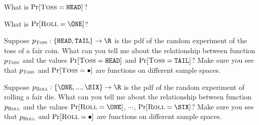   \begin{myenum}

  \item What is
    $\Pr[\textsc{Toss} = \texttt{HEAD}]$?
    
  \item
    What is
    $\Pr[\textsc{Roll} = \ONE]$?
    
  \item
    Suppose $p_{\textsc{Toss}}: \{\HEAD, \TAIL\} \rightarrow \R$
    is the pdf of the random experiment of the toss of a fair coin.
    What can you tell me about the relationship between
    function $p_{\textsc{Toss}}$ and the values
    $\Pr[\textsc{Toss} = \texttt{HEAD}]$ and
    $\Pr[\textsc{Toss} = \texttt{TAIL}]$?
    Make sure you see that $p_{\textsc{Toss}}$ and
    $\Pr[\textsc{Toss} = \bullet]$ are functions on different
    sample spaces.
    
  \item
    Suppose
    $p_{\textsc{Roll}}: \{\ONE, ..., \SIX\} \rightarrow \R$
    is the pdf of the random experiment of rolling a fair die.
    What can you tell me about the relationship between
    function $p_{\textsc{Roll}}$ and the values
    $\Pr[\textsc{Roll} = \ONE]$,
    $\cdots$,
    $\Pr[\textsc{Roll} = \SIX]$?
    Make sure you see that $p_{\textsc{Roll}}$ and
    $\Pr[\textsc{Roll} = \bullet]$ are functions on different
    sample spaces.
    
  \end{myenum}
  
